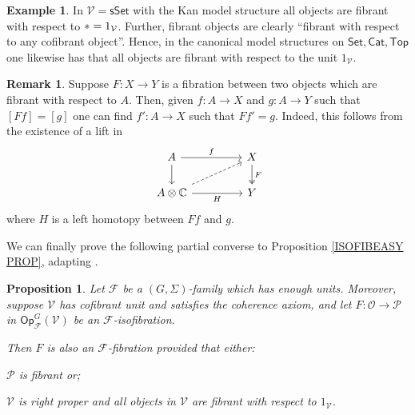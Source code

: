 \documentclass[a4paper,10pt
,draft
]{article}%
\numberwithin{equation}{section}
\numberwithin{figure}{section}
\newtheorem{proposition}[equation]{Proposition}%
\theoremstyle{definition} %
\newtheorem{example}[equation]{Example}%
\newtheorem{remark}[equation]{Remark}%
\newcommand{\Op}{\mathsf{Op}}%
\newcommand{\F}{\ensuremath{\mathcal F}}
\newcommand{\V}{\ensuremath{\mathcal V}}
\renewcommand{\O}{\ensuremath{\mathcal O}}
\renewcommand{\P}{\ensuremath{\mathcal P}}
\newcommand{\1}{\ensuremath{\mathbbm 1}}%
\begin{document}
\begin{example}
	In $\V=\mathsf{sSet}$ with the Kan model structure 
	all objects are fibrant with respect to $\** = 1_{\V}$.
%	
	Further, fibrant objects are clearly ``fibrant with respect to any cofibrant object''.
	Hence, in the canonical model structures on 
	$\mathsf{Set}, \mathsf{Cat}, \mathsf{Top}$
	one likewise has that all objects are fibrant with respect to the unit $1_{\V}$.
\end{example}


\begin{remark}\label{RELFIBLIFT REM}
	Suppose $F\colon X \to Y$ is a fibration between two objects
	which are fibrant with respect to $A$.
	Then, given 
	$f\colon A \to X$ and $g \colon A \to Y$
	such that
	$[Ff] = [g]$
	one can find 
	$f'\colon A \to X$ such that $Ff' =g$.
	Indeed, this follows from the existence of a 
	lift in 
\begin{equation}
\begin{tikzcd}[column sep = 45pt]
	A \ar{d} \ar{r}{f}
&
	X \ar[twoheadrightarrow]{d}{F}
\\
	A \otimes \mathbb{C} \ar{r}[swap]{H} \ar[dashed]{ru}
&
	Y
\end{tikzcd}
\end{equation}
	where $H$ is a left homotopy between $Ff$ and $g$.
\end{remark}


We can finally prove the following partial converse to Proposition \ref{ISOFIBEASY PROP}, 
adapting \cite[Prop. 2.5]{Ber07b}.


\begin{proposition}
	\label{ISOFIBHARD PROP}
	Let $\F$ be a $(G,\Sigma)$-family which has enough units.
	Moreover, suppose $\V$ has cofibrant unit
	and satisfies the coherence axiom,
	and let $F: \O \to \P$ in $\Op^G_\F(\V)$
	be an $\F$-isofibration.
	
	Then $F$ is also an $\F$-fibration
	provided that either:
	\begin{enumerate*}[label = (\roman*)]
		\item $\P$ is fibrant or;
		\item $\V$ is right proper and
		all objects in $\V$ are fibrant with respect to $1_{\V}$.
	\end{enumerate*}
\end{proposition}
\end{document}
